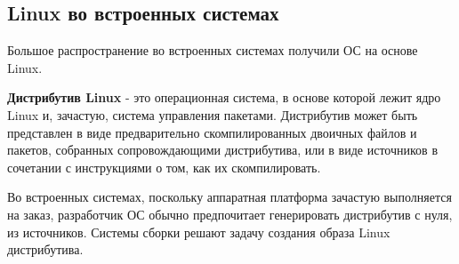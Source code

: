 \newpage
\subsection{Linux во встроенных системах}
Большое распространение во встроенных системах получили ОС на основе Linux.

\textbf{Дистрибутив Linux} - это операционная система, в основе которой лежит ядро Linux и, зачастую, система управления пакетами. 
Дистрибутив может быть представлен в виде предварительно скомпилированных двоичных файлов и пакетов, собранных сопровождающими дистрибутива, или в виде источников в сочетании с инструкциями о том, как их скомпилировать.

Во встроенных системах, поскольку аппаратная платформа зачастую выполняется на заказ, разработчик ОС обычно предпочитает генерировать дистрибутив с нуля, из источников.
Системы сборки решают задачу создания образа Linux дистрибутива. 


